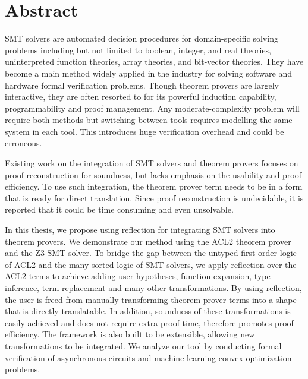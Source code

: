 
\chapter{Abstract}

SMT solvers are automated decision procedures for domain-specific solving
problems including but not limited to boolean, integer, and real theories,
uninterpreted function theories, array theories, and bit-vector theories. They
have become a main method widely applied in the industry for solving software
and hardware formal verification problems. Though theorem provers are largely
interactive, they are often resorted to for its powerful induction capability,
programmability and proof management. Any moderate-complexity problem will
require both methods but switching between tools requires modelling the same
system in each tool. This introduces huge verification overhead and could be
erroneous.

Existing work on the integration of SMT solvers and theorem provers focuses on
proof reconstruction for soundness, but lacks emphasis on the usability and
proof efficiency. To use such integration, the theorem prover term needs to be
in a form that is ready for direct translation. Since proof reconstruction is
undecidable, it is reported that it could be time consuming and even unsolvable.

In this thesis, we propose using reflection for integrating SMT solvers into
theorem provers. We demonstrate our method using the ACL2 theorem prover and the
Z3 SMT solver. To bridge the gap between the untyped first-order logic of ACL2
and the many-sorted logic of SMT solvers, we apply reflection over the ACL2
terms to achieve adding user hypotheses, function expansion, type inference,
term replacement and many other transformations. By using reflection, the user
is freed from manually transforming theorem prover terms into a shape that is
directly translatable. In addition, soundness of these transformations is
easily achieved and does not require extra proof time, therefore promotes proof
efficiency. The framework is also built to be extensible, allowing new
transformations to be integrated. We analyze our tool by conducting formal
verification of asynchronous circuits and machine learning convex optimization
problems.


